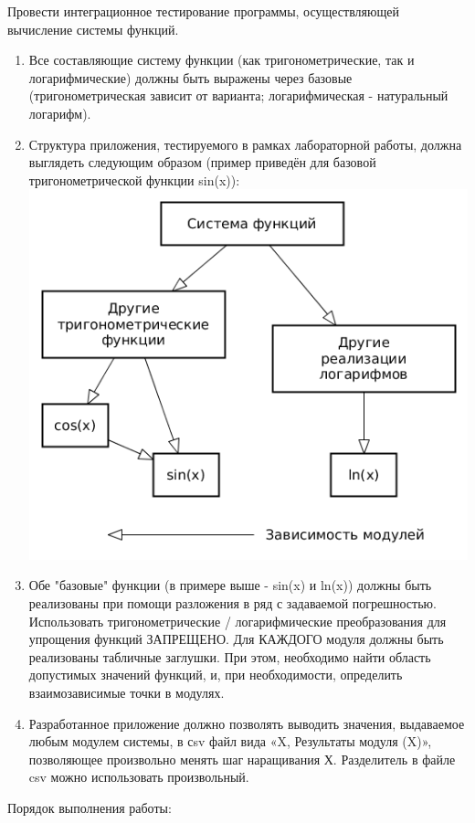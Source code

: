 Провести интеграционное тестирование программы, осуществляющей вычисление
системы функций.
\begin{enumerate}
\item Все составляющие систему функции (как тригонометрические,
так и логарифмические) должны быть выражены через базовые (тригонометрическая
зависит от варианта; логарифмическая - натуральный логарифм).
\item Структура приложения, тестируемого в рамках лабораторной работы, должна
выглядеть следующим образом (пример приведён для базовой тригонометрической
функции sin(x)):
\includegraphics[width=400bp]{img/scheme.png}

\item Обе "базовые" функции (в примере выше - sin(x) и ln(x)) должны быть
реализованы при помощи разложения в ряд с задаваемой погрешностью.
Использовать тригонометрические / логарифмические преобразования
для упрощения функций ЗАПРЕЩЕНО. Для КАЖДОГО модуля должны быть реализованы
табличные заглушки. При этом, необходимо найти область допустимых
значений функций, и, при необходимости, определить взаимозависимые точки в модулях.
\item Разработанное приложение должно позволять выводить значения, выдаваемое
любым модулем системы, в сsv файл вида «X, Результаты модуля (X)», позволяющее
произвольно менять шаг наращивания Х. Разделитель в файле csv можно использовать
произвольный.
\end{enumerate}

Порядок выполнения работы:


